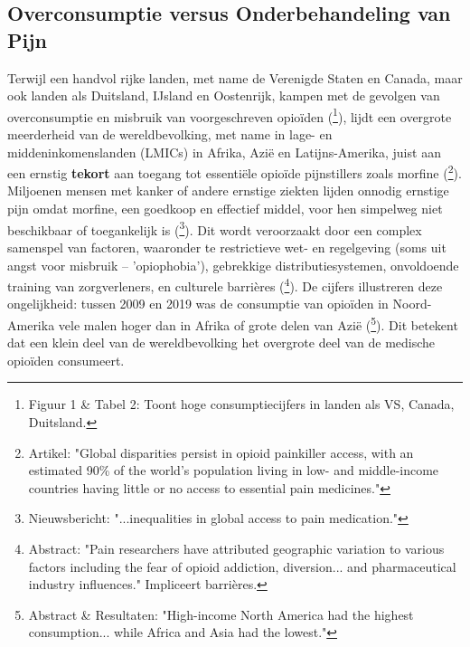 \documentclass[11pt, a4paper]{report} %
\begin{document}
\subsection{Overconsumptie versus Onderbehandeling van Pijn}
Terwijl een handvol rijke landen, met name de Verenigde Staten en Canada, maar ook landen als Duitsland, IJsland en Oostenrijk, kampen met de gevolgen van overconsumptie en misbruik van voorgeschreven opioïden (\cite{Berterame2021GlobalConsumptionPresc}\footnote{Figuur 1 & Tabel 2: Toont hoge consumptiecijfers in landen als VS, Canada, Duitsland.}), lijdt een overgrote meerderheid van de wereldbevolking, met name in lage- en middeninkomenslanden (LMICs) in Afrika, Azië en Latijns-Amerika, juist aan een ernstig \textbf{tekort} aan toegang tot essentiële opioïde pijnstillers zoals morfine (\cite{UCLNews2022GlobalDisparities}\footnote{Artikel: "Global disparities persist in opioid painkiller access, with an estimated 90\% of the world's population living in low- and middle-income countries having little or no access to essential pain medicines."}). Miljoenen mensen met kanker of andere ernstige ziekten lijden onnodig ernstige pijn omdat morfine, een goedkoop en effectief middel, voor hen simpelweg niet beschikbaar of toegankelijk is (\cite{INCB2024Report}\footnote{Nieuwsbericht: "...inequalities in global access to pain medication."}). Dit wordt veroorzaakt door een complex samenspel van factoren, waaronder te restrictieve wet- en regelgeving (soms uit angst voor misbruik – 'opiophobia'), gebrekkige distributiesystemen, onvoldoende training van zorgverleners, en culturele barrières (\cite{Sankaran2016OpioidAtlas}\footnote{Abstract: "Pain researchers have attributed geographic variation to various factors including the fear of opioid addiction, diversion... and pharmaceutical industry influences." Impliceert barrières.}). De cijfers illustreren deze ongelijkheid: tussen 2009 en 2019 was de consumptie van opioïden in Noord-Amerika vele malen hoger dan in Afrika of grote delen van Azië (\cite{Richards2022GlobalConsumption}\footnote{Abstract & Resultaten: "High-income North America had the highest consumption... while Africa and Asia had the lowest."}). Dit betekent dat een klein deel van de wereldbevolking het overgrote deel van de medische opioïden consumeert.
\end{document}
